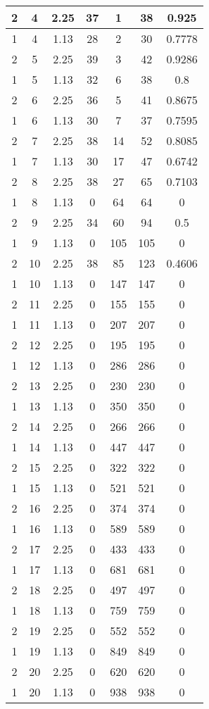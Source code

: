 \documentclass[letterpaper, 12pt]{article}
\begin{document}
\begin{longtable}{|c|c|c|c|c|c|c|}
\hline
2 & 4 & 2.25 & 37 & 1 & 38 & 0.925 \\
\hline
1 & 4 & 1.13 & 28 & 2 & 30 & 0.7778 \\
\hline
2 & 5 & 2.25 & 39 & 3 & 42 & 0.9286 \\
\hline
1 & 5 & 1.13 & 32 & 6 & 38 & 0.8 \\
\hline
2 & 6 & 2.25 & 36 & 5 & 41 & 0.8675 \\
\hline
1 & 6 & 1.13 & 30 & 7 & 37 & 0.7595 \\
\hline
2 & 7 & 2.25 & 38 & 14 & 52 & 0.8085 \\
\hline
1 & 7 & 1.13 & 30 & 17 & 47 & 0.6742 \\
\hline
2 & 8 & 2.25 & 38 & 27 & 65 & 0.7103 \\
\hline
1 & 8 & 1.13 & 0 & 64 & 64 & 0 \\
\hline
2 & 9 & 2.25 & 34 & 60 & 94 & 0.5 \\
\hline
1 & 9 & 1.13 & 0 & 105 & 105 & 0 \\
\hline
2 & 10 & 2.25 & 38 & 85 & 123 & 0.4606 \\
\hline
1 & 10 & 1.13 & 0 & 147 & 147 & 0 \\
\hline
2 & 11 & 2.25 & 0 & 155 & 155 & 0 \\
\hline
1 & 11 & 1.13 & 0 & 207 & 207 & 0 \\
\hline
2 & 12 & 2.25 & 0 & 195 & 195 & 0 \\
\hline
1 & 12 & 1.13 & 0 & 286 & 286 & 0 \\
\hline
2 & 13 & 2.25 & 0 & 230 & 230 & 0 \\
\hline
1 & 13 & 1.13 & 0 & 350 & 350 & 0 \\
\hline
2 & 14 & 2.25 & 0 & 266 & 266 & 0 \\
\hline
1 & 14 & 1.13 & 0 & 447 & 447 & 0 \\
\hline
2 & 15 & 2.25 & 0 & 322 & 322 & 0 \\
\hline
1 & 15 & 1.13 & 0 & 521 & 521 & 0 \\
\hline
2 & 16 & 2.25 & 0 & 374 & 374 & 0 \\
\hline
1 & 16 & 1.13 & 0 & 589 & 589 & 0 \\
\hline
2 & 17 & 2.25 & 0 & 433 & 433 & 0 \\
\hline
1 & 17 & 1.13 & 0 & 681 & 681 & 0 \\
\hline
2 & 18 & 2.25 & 0 & 497 & 497 & 0 \\
\hline
1 & 18 & 1.13 & 0 & 759 & 759 & 0 \\
\hline
2 & 19 & 2.25 & 0 & 552 & 552 & 0 \\
\hline
1 & 19 & 1.13 & 0 & 849 & 849 & 0 \\
\hline
2 & 20 & 2.25 & 0 & 620 & 620 & 0 \\
\hline
1 & 20 & 1.13 & 0 & 938 & 938 & 0 \\
\hline
\end{longtable}
\end{document}
